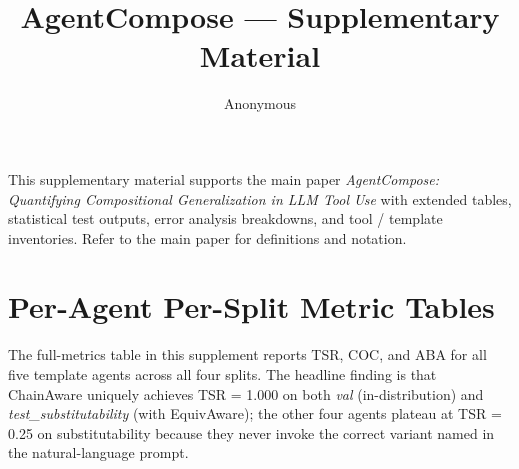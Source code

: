 ﻿\documentclass{article}
\title{AgentCompose --- Supplementary Material}
\author{Anonymous}
\date{}
\begin{document}
\maketitle

This supplementary material supports the main paper \emph{AgentCompose:
Quantifying Compositional Generalization in LLM Tool Use} with extended
tables, statistical test outputs, error analysis breakdowns, and tool /
template inventories. Refer to the main paper for definitions and notation.

\section{Per-Agent Per-Split Metric Tables}
\label{app:per-agent-metrics}

The full-metrics table in this supplement reports TSR, COC, and ABA for all five template
agents across all four splits. The headline finding is that ChainAware
uniquely achieves TSR = 1.000 on both \emph{val} (in-distribution) and
\emph{test\_substitutability} (with EquivAware); the other four agents
plateau at TSR = 0.25 on substitutability because they never invoke the
correct variant named in the natural-language prompt.
\end{document}
